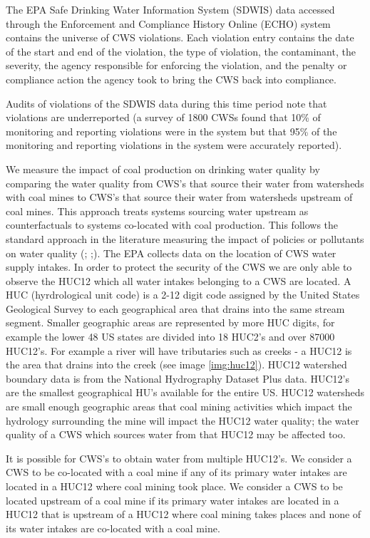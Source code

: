 \documentclass{article}
\begin{document}
The EPA Safe Drinking Water Information System (SDWIS) data accessed through the Enforcement and Compliance History Online (ECHO) system contains the universe of CWS violations. Each violation entry contains the date of the start and end of the violation, the type of violation, the contaminant, the severity, the agency responsible for enforcing the violation, and the penalty or compliance action the agency took to bring the CWS back into compliance.

Audits of violations of the SDWIS data during this time period note that violations are underreported (a survey of 1800 CWSs found that 10\% of monitoring and reporting violations were in the system but that 95\% of the monitoring and reporting violations in the system were accurately reported).

We measure the impact of coal production on drinking water quality by comparing the water quality from CWS's that source their water from watersheds with coal mines to CWS's that source their water from watersheds upstream of coal mines. This approach treats systems sourcing water upstream as counterfactuals to systems co-located with coal production. This follows the standard approach in the literature measuring the impact of policies or pollutants on water quality (\cite{keiser}; \cite{keiser};\cite{china cancer upstream}). The EPA collects data on the location of CWS water supply intakes. In order to protect the security of the CWS we are only able to observe the HUC12 which all water intakes belonging to a CWS are located. A HUC (hyrdrological unit code) is a 2-12 digit code assigned by the United States Geological Survey to each geographical area that drains into the same stream segment. Smaller geographic areas are represented by more HUC digits, for example the lower 48 US states are divided into 18 HUC2's and over 87000 HUC12's. For example a river will have tributaries such as creeks - a HUC12 is the area that drains into the creek (see image \ref{img:huc12}). HUC12 watershed boundary data is from the National Hydrography Dataset Plus data. HUC12's are the smallest geographical HU's available for the entire US. HUC12 watersheds are small enough geographic areas that coal mining activities which impact the hydrology surrounding the mine will impact the HUC12 water quality; the water quality of a CWS which sources water from that HUC12 may be affected too. 

It is possible for CWS's to obtain water from multiple HUC12's. We consider a CWS to be co-located with a coal mine if any of its primary water intakes are located in a HUC12 where coal mining took place. We consider a CWS to be located upstream of a coal mine if its primary water intakes are located in a HUC12 that is upstream of a HUC12 where coal mining takes places and none of its water intakes are co-located with a coal mine.
\end{document}
